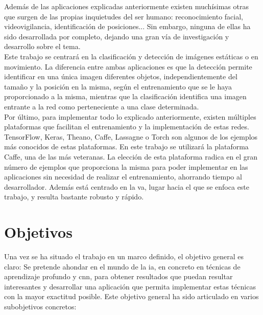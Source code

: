 Además de las aplicaciones explicadas anteriormente existen muchísimas otras que surgen de las propias inquietudes del ser humano: reconocimiento facial, videovigilancia, identificación de posiciones... Sin embargo, ninguna de ellas ha sido desarrollada por completo, dejando una gran vía de investigación y desarrollo sobre el tema.\\

Este trabajo se centrará en la clasificación y detección de imágenes estáticas o en movimiento. La diferencia entre ambas aplicaciones es que la detección permite identificar en una única imagen diferentes objetos, independientemente del tamaño y la posición en la misma, según el entrenamiento que se le haya proporcionado a la misma, mientras que la clasificación identifica una imagen entrante a la red como perteneciente a una clase determinada.\\

Por último, para implementar todo lo explicado anteriormente, existen múltiples plataformas que facilitan el entrenamiento y la implementación de estas redes. TensorFlow, Keras, Theano, Caffe, Lassagne o Torch son algunos de los ejemplos más conocidos de estas plataformas. En este trabajo se utilizará la plataforma Caffe, una de las más veteranas. La elección de esta plataforma radica en el gran número de ejemplos que proporciona la misma para poder implementar en las aplicaciones sin necesidad de realizar el entrenamiento, ahorrando tiempo al desarrollador. Además está centrado en la \acrshort{va}, lugar hacia el que se enfoca este trabajo, y resulta bastante robusto y rápido.\\


\section{Objetivos}
Una vez se ha situado el trabajo en un marco definido, el objetivo general es claro: Se pretende ahondar en el mundo de la \acrshort{ia}, en concreto en técnicas de aprendizaje profundo y \acrshort{cnn}, para obtener resultados que puedan resultar interesantes y desarrollar una aplicación que permita implementar estas técnicas con la mayor exactitud posible. Este objetivo general ha sido  articulado en varios subobjetivos concretos: 

